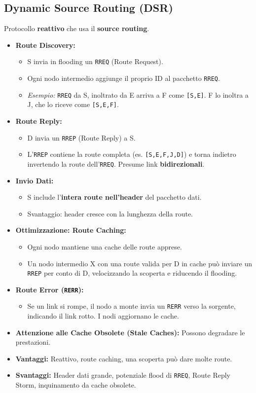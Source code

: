 \subsection{Dynamic Source Routing (DSR)}
Protocollo \textbf{reattivo} che usa il \textbf{source routing}.
\begin{itemize}
    \item \textbf{Route Discovery:}
    \begin{itemize}
        \item S invia in flooding un \texttt{RREQ} (Route Request).
        \item Ogni nodo intermedio aggiunge il proprio ID al pacchetto \texttt{RREQ}.
        \item \textit{Esempio:} \texttt{RREQ} da S, inoltrato da E arriva a F come \texttt{[S,E]}. F lo inoltra a J, che lo riceve come \texttt{[S,E,F]}.
    \end{itemize}
    \item \textbf{Route Reply:}
    \begin{itemize}
        \item D invia un \texttt{RREP} (Route Reply) a S.
        \item L'\texttt{RREP} contiene la route completa (es. \texttt{[S,E,F,J,D]}) e torna indietro invertendo la route dell'\texttt{RREQ}. Presume link \textbf{bidirezionali}.
    \end{itemize}
    \item \textbf{Invio Dati:}
    \begin{itemize}
        \item S include l'\textbf{intera route nell'header} del pacchetto dati.
        \item Svantaggio: header cresce con la lunghezza della route.
    \end{itemize}
    \item \textbf{Ottimizzazione: Route Caching:}
    \begin{itemize}
        \item Ogni nodo mantiene una cache delle route apprese.
        \item Un nodo intermedio X con una route valida per D in cache può inviare un \texttt{RREP} per conto di D, velocizzando la scoperta e riducendo il flooding.
    \end{itemize}
    \item \textbf{Route Error (\texttt{RERR}):}
    \begin{itemize}
        \item Se un link si rompe, il nodo a monte invia un \texttt{RERR} verso la sorgente, indicando il link rotto. I nodi aggiornano le cache.
    \end{itemize}
    \item \textbf{Attenzione alle Cache Obsolete (Stale Caches):} Possono degradare le prestazioni.
    \item \textbf{Vantaggi:} Reattivo, route caching, una scoperta può dare molte route.
    \item \textbf{Svantaggi:} Header dati grande, potenziale flood di \texttt{RREQ}, Route Reply Storm, inquinamento da cache obsolete.
\end{itemize}

